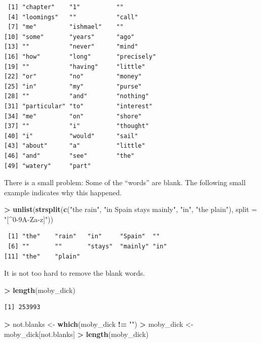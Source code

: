 \documentclass[
]{krantz}
\makeatletter
\newenvironment{Shaded}{\begin{snugshade}}{\end{snugshade}}
\newcommand{\DataTypeTok}[1]{\textcolor[rgb]{0.27,0.27,0.27}{#1}}
\newcommand{\KeywordTok}[1]{\textcolor[rgb]{0.27,0.27,0.27}{\textbf{#1}}}
\newcommand{\NormalTok}[1]{#1}
\newcommand{\OperatorTok}[1]{\textcolor[rgb]{0.43,0.43,0.43}{\textbf{#1}}}
\newcommand{\StringTok}[1]{\textcolor[rgb]{0.5,0.5,0.5}{#1}}
\newenvironment{kframe}{%
\medskip{}
\setlength{\fboxsep}{.8em}
 \def\at@end@of@kframe{}%
 \ifinner\ifhmode%
  \def\at@end@of@kframe{\end{minipage}}%
  \begin{minipage}{\columnwidth}%
 \fi\fi%
 \def\FrameCommand##1{\hskip\@totalleftmargin \hskip-\fboxsep
 \colorbox{shadecolor}{##1}\hskip-\fboxsep
     \hskip-\linewidth \hskip-\@totalleftmargin \hskip\columnwidth}%
 \MakeFramed {\advance\hsize-\width
   \@totalleftmargin\z@ \linewidth\hsize
   \@setminipage}}%
 {\par\unskip\endMakeFramed%
 \at@end@of@kframe}
\renewenvironment{Shaded}{\begin{kframe}}{\end{kframe}}
\makeatother
\begin{document}
\begin{verbatim}
 [1] "chapter"    "1"          ""          
 [4] "loomings"   ""           "call"      
 [7] "me"         "ishmael"    ""          
[10] "some"       "years"      "ago"       
[13] ""           "never"      "mind"      
[16] "how"        "long"       "precisely" 
[19] ""           "having"     "little"    
[22] "or"         "no"         "money"     
[25] "in"         "my"         "purse"     
[28] ""           "and"        "nothing"   
[31] "particular" "to"         "interest"  
[34] "me"         "on"         "shore"     
[37] ""           "i"          "thought"   
[40] "i"          "would"      "sail"      
[43] "about"      "a"          "little"    
[46] "and"        "see"        "the"       
[49] "watery"     "part"      
\end{verbatim}

There is a small problem: Some of the ``words'' are blank. The following small example indicates why this happened.

\begin{Shaded}
\begin{Highlighting}[]
\OperatorTok{\textgreater{}}\StringTok{ }\KeywordTok{unlist}\NormalTok{(}\KeywordTok{strsplit}\NormalTok{(}\KeywordTok{c}\NormalTok{(}\StringTok{"the rain"}\NormalTok{, }\StringTok{"in Spain    stays mainly"}\NormalTok{, }\StringTok{"in"}\NormalTok{, }\StringTok{"the plain"}\NormalTok{), }\DataTypeTok{split =} \StringTok{"[\^{}0{-}9A{-}Za{-}z]"}\NormalTok{))}
\end{Highlighting}
\end{Shaded}

\begin{verbatim}
 [1] "the"    "rain"   "in"     "Spain"  ""      
 [6] ""       ""       "stays"  "mainly" "in"    
[11] "the"    "plain" 
\end{verbatim}

It is not too hard to remove the blank words.

\begin{Shaded}
\begin{Highlighting}[]
\OperatorTok{\textgreater{}}\StringTok{ }\KeywordTok{length}\NormalTok{(moby\_dick)}
\end{Highlighting}
\end{Shaded}

\begin{verbatim}
[1] 253993
\end{verbatim}

\begin{Shaded}
\begin{Highlighting}[]
\OperatorTok{\textgreater{}}\StringTok{ }\NormalTok{not.blanks \textless{}{-}}\StringTok{ }\KeywordTok{which}\NormalTok{(moby\_dick }\OperatorTok{!=}\StringTok{ ""}\NormalTok{)}
\OperatorTok{\textgreater{}}\StringTok{ }\NormalTok{moby\_dick \textless{}{-}}\StringTok{ }\NormalTok{moby\_dick[not.blanks]}
\OperatorTok{\textgreater{}}\StringTok{ }\KeywordTok{length}\NormalTok{(moby\_dick)}
\end{Highlighting}
\end{Shaded}
\end{document}
